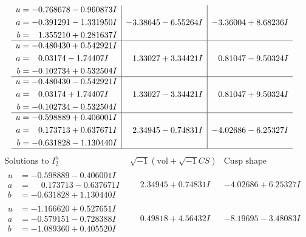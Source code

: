 \documentclass[1p]{elsarticle_modified}
\theoremstyle{definition}
\newcommand{\I}{\sqrt{-1}}
\begin{document}
$$\begin{array}{c|c|c}
\begin{aligned}
u &= -0.768678 - 0.960873 I \\
a &= -0.391291 - 1.331950 I \\
b &= \phantom{-}1.355210 + 0.281637 I\end{aligned}
 & -3.38645 - 6.55264 I & -3.36004 + 8.68236 I \\ \hline\begin{aligned}
u &= -0.480430 + 0.542921 I \\
a &= \phantom{-}0.03174 - 1.74407 I \\
b &= -0.102734 + 0.532504 I\end{aligned}
 & \phantom{-}1.33027 + 3.34421 I & \phantom{-}0.81047 - 9.50324 I \\ \hline\begin{aligned}
u &= -0.480430 - 0.542921 I \\
a &= \phantom{-}0.03174 + 1.74407 I \\
b &= -0.102734 - 0.532504 I\end{aligned}
 & \phantom{-}1.33027 - 3.34421 I & \phantom{-}0.81047 + 9.50324 I \\ \hline\begin{aligned}
u &= -0.598889 + 0.406001 I \\
a &= \phantom{-}0.173713 + 0.637671 I \\
b &= -0.631828 - 1.130440 I\end{aligned}
 & \phantom{-}2.34945 - 0.74831 I & -4.02686 - 6.25327 I\\
 \hline 
 \end{array}$$\newpage$$\begin{array}{c|c|c}  
\text{Solutions to }I^u_{2}& \I (\text{vol} + \sqrt{-1}CS) & \text{Cusp shape}\\
 \hline 
\begin{aligned}
u &= -0.598889 - 0.406001 I \\
a &= \phantom{-}0.173713 - 0.637671 I \\
b &= -0.631828 + 1.130440 I\end{aligned}
 & \phantom{-}2.34945 + 0.74831 I & -4.02686 + 6.25327 I \\ \hline\begin{aligned}
u &= -1.166620 + 0.527651 I \\
a &= -0.579151 - 0.728388 I \\
b &= -1.089360 + 0.405520 I\end{aligned}
 & \phantom{-}0.49818 + 4.56432 I & -8.19695 - 3.48083 I \\ \hline\begin{aligned}

\end{aligned}
\end{array}$$
\end{document}
